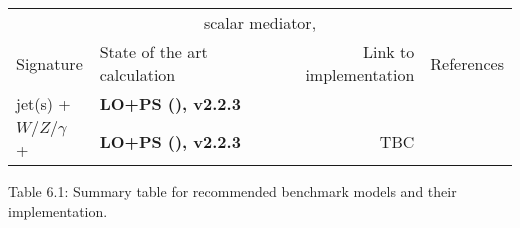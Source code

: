 \begin{footnotesize}
\begin{table}
\begin{tabular}{llrr}
	\cmidrule(r){2-4} 
	\multicolumn{4}{c}{scalar mediator, \tchannel}\\
	\cmidrule(r){2-4} 
	Signature & State of the art calculation & Link to implementation & References \\ 
		\cmidrule(r){1-4} 
		
	jet(s) + \MET{} & \textbf{LO+PS (\madgraph), v2.2.3} & \cite{ForumSVN_TChannel}& \cite{Papucci:2014iwa} \\ 
	$W/Z/\gamma$ + \MET{} & \textbf{LO+PS (\madgraph), v2.2.3} & TBC  & \cite{Alwall:2014hca,Alloul:2013bka,Degrande:2011ua}\\ 
		
%	
	
	\bottomrule 
	\end{tabular}
	\label{tab:summaryModels}
\end{table}

\end{footnotesize}

\begin{center}
	Table 6.1: Summary table for recommended benchmark models and their implementation.
\end{center}
